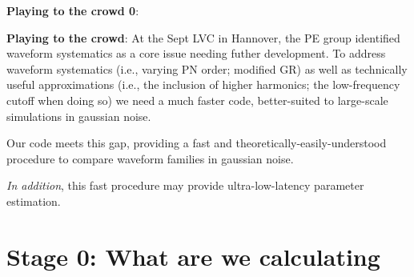 \documentclass[twocolumn,prd,nofootinbib]{revtex4}
\begin{document}
\noindent \textbf{Playing to the crowd 0}: 

\noindent \textbf{Playing to the crowd}: At the Sept LVC in Hannover, the PE group identified waveform systematics as a
core issue needing futher development.  To address waveform systematics (i.e., varying PN order; modified GR) as well as
technically useful approximations (i.e., the inclusion of higher harmonics; the low-frequency cutoff when doing so) we
need a much faster code, better-suited to large-scale simulations in gaussian noise. 

Our code meets this gap, providing a fast and theoretically-easily-understood procedure to compare waveform families in
gaussian noise.  

\emph{In addition}, this fast procedure may provide ultra-low-latency parameter estimation.

\section{Stage 0: What are we calculating}
\end{document}

